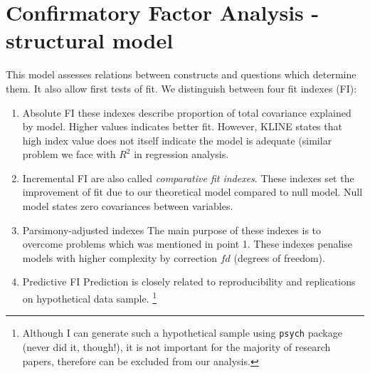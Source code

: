 \documentclass[10pt,a4paper]{article}
\begin{document}
\section{Confirmatory Factor Analysis - structural model}
This model assesses relations between constructs and questions which determine them. It also allow first tests of fit. We distinguish between four fit indexes (FI):
\begin{enumerate}
\item Absolute FI \newline
these indexes describe proportion of total covariance explained by model. Higher values indicates better fit. However, KLINE states that high index value does not itself indicate the model is adequate (similar problem we face with $R^2$ in regression analysis.
\item Incremental FI \newline
are also called \emph{comparative fit indexes}. These indexes set the improvement of fit due to our theoretical model compared to null model. Null model states zero covariances between variables.
\item Parsimony-adjusted indexes \newline
The main purpose of these indexes is to overcome problems which was mentioned in point 1. These indexes penalise models with higher complexity by correction $fd$ (degrees of freedom). 
\item Predictive FI \newline
Prediction is closely related to reproducibility and replications on hypothetical data sample. \footnote{Although I can generate such a hypothetical sample using \texttt{psych} package (never did it, though!), it is not important for the majority of research papers, therefore can be excluded from our analysis.}
\end{enumerate}
\end{document}
